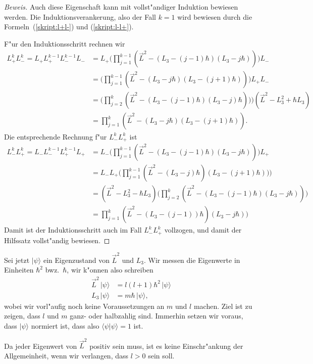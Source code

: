 \begin{proof}[Beweis]
Auch diese Eigenschaft kann mit vollst"andiger Induktion bewiesen
werden.
Die Induktionsverankerung, also der Fall $k=1$ wird bewiesen durch
die Formeln~(\ref{skript:l+l-}) und (\ref{skript:l-l+}).

F"ur den Induktionsschritt rechnen wir
\begin{align*}
L_+^kL_-^k
=
L_+ L_+^{k-1}L_-^{k-1}L_-
&=
L_+\biggl(
\prod_{j=1}^{k-1} (\vec L^2 - (L_3-(j-1)\hbar)(L_3-j\hbar))
\biggr)L_-
\\
&=
\biggl(
\prod_{j=1}^{k-1} (\vec L^2 - (L_3-j\hbar)(L_3-(j+1)\hbar))
\biggr)L_+L_-
\\
&=
\biggl(
\prod_{j=2}^{k} (\vec L^2 - (L_3-(j-1)\hbar)(L_3-j)\hbar))
\biggr)
(\vec L^2 -L_3^2+\hbar L_3)
\\
&=
\prod_{j=1}^{k} (\vec L^2 - (L_3-j\hbar)(L_3-(j+1)\hbar)).
\end{align*}
Die entsprechende Rechnung f"ur $L_-^kL_+^k$ ist
\begin{align*}
L_-^kL_+^k
=
L_-L_-^{k-1}L_+^{k-1}L_+
&=
L_-\biggl(
\prod_{j=1}^{k-1}
(\vec L^2-(L_3-(j-1)\hbar)(L_3-j\hbar))
\biggr)L_+
\\
&=
L_-L_+\biggl(
\prod_{j=1}^{k-1}
(\vec L^2-(L_3-j)\hbar)(L_3-(j+1)\hbar))
\biggr)
\\
&=
(\vec L^2-L_3^2-\hbar L_3)\biggl(
\prod_{j=2}^k
(\vec L^2-(L_3-(j-1)\hbar)(L_3-j\hbar))
\biggr)
\\
&=
\prod_{j=1}^k
(\vec L^2-(L_3-(j-1))\hbar)(L_3-j\hbar))
\end{align*}
Damit ist der Induktionsschritt auch im Fall $L_-^kL_+^k$ vollzogen, und
damit der Hilfssatz vollst"andig bewiesen.
\end{proof}

Sei jetzt $|\psi\rangle$ ein Eigenzustand von $\vec L^2$ und $L_3$.
Wir messen die Eigenwerte in Einheiten $\hbar^2$ bwz.~$\hbar$, wir
k"onnen also schreiben
\begin{align*}
\vec L^2\, |\psi\rangle &= l(l+1)\hbar^2\,|\psi\rangle \\
     L_3\, |\psi\rangle &= m\hbar\,       |\psi\rangle,
\end{align*}
wobei wir vorl"aufig noch keine Voraussetzungen an $m$ und $l$ machen.
Ziel ist zu zeigen, dass $l$ und $m$ ganz- oder halbzahlig sind.
Immerhin setzen wir voraus, dass $|\psi\rangle$ normiert ist, dass also
$\langle\psi|\psi\rangle=1$ ist.

Da jeder Eigenwert von $\vec L^2$ positiv sein muss, ist es keine
Einschr"ankung der Allgemeinheit, wenn wir verlangen, dass $l>0$ sein
soll.

